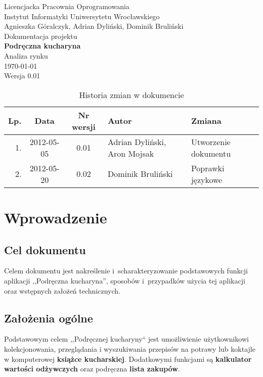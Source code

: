 \documentclass[12pt,leqno, twoside]{mwart}
\begin{document}
\thispagestyle{empty}
\begin{center}
Licencjacka Pracownia Oprogramowania \\ Instytut
Informatyki Uniwersytetu Wrocławskiego \\
\vspace{4cm}
\Large Agnieszka Góralczyk, Adrian Dyliński, Dominik Bruliński \\
\vspace{0.5cm}
\huge Dokumentacja projektu\\ \textbf{Podręczna kucharyna}\\ \Large Analiza rynku\\
\vspace{1cm}
\normalsize \today \\
\vspace{2cm}
\normalsize Wersja 0.01
\end{center}

\newpage


\begin{table}
	\centering
	\caption{Historia zmian w dokumencie}
		\begin{tabular}{|r|c|c|l|l|}
		\hline
		Lp. & Data       & Nr wersji & Autor               & Zmiana \\ \hline
		1.   & 2012-05-05 & 0.01 & Adrian Dyliński, Aron Mojsak & Utworzenie dokumentu \\ \hline
		2.  & 2012-05-20 & 0.02 & Dominik Bruliński & Poprawki językowe \\ \hline
		\end{tabular}
\end{table}

\newpage

\tableofcontents
\newpage

\section{Wprowadzenie}
  \subsection{Cel dokumentu}
  Celem dokumentu jest nakreślenie i~scharakteryzowanie podstawowych funkcji aplikacji ,,Podręczna kucharyna'', sposobów i~przypadków użycia tej aplikacji oraz wstępnych założeń technicznych.
  \subsection{Założenia ogólne}
  Podstawowym celem ,,Podręcznej kucharyny`` jest umożliwienie użytkownikowi kolekcjonowania, przeglądania i wyszukiwania przepisów na potrawy lub koktajle w komputerowej \textbf{książce kucharskiej}. Dodatkowymi funkcjami są \textbf{kalkulator wartości odżywczych} oraz podręczna \textbf{lista zakupów}.
\end{document}
